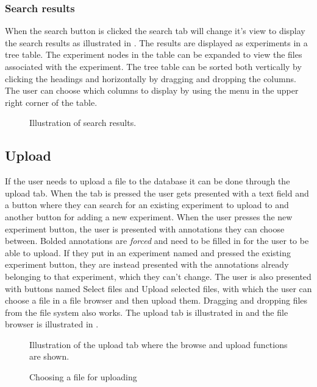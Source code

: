 \subsubsection{Search results}
When the search button is clicked the search tab will change it's view to display the search results as illustrated in . The results are displayed as experiments in a tree table. The experiment nodes in the table can be expanded to view the files associated with the experiment. The tree table can be sorted both vertically by clicking the headings and horizontally by dragging and dropping the columns. The user can choose which columns to display by using the menu in the upper right corner of the table.

\begin{figure}[htb]
	\caption{Illustration of search results.}
	\label{fig:des_search-results}
\end{figure}


\subsection{Upload}
If the user needs to upload a file to the database it can be done through the upload tab.
When the tab is pressed the user gets presented with a text field and a button where they can search for an existing experiment to upload to and another button for adding a new experiment. When the user presses the new experiment button, the user is presented with annotations they can choose between. Bolded annotations are {\em forced} and need to be filled in for the user to be able to upload. If they put in an experiment named and pressed the existing experiment button, they are instead presented with the annotations already belonging to that experiment, which they can't change. The user is also presented with buttons named Select files and Upload selected files, with which the user can choose a file in a file browser and then upload them. Dragging and dropping files from the file system also works. The upload tab is illustrated in  and the file browser is illustrated in .
\begin{figure}[htb]
	\caption{Illustration of the upload tab where the browse and upload functions are shown.}
	\label{fig:des_upload-view}
\end{figure}

\begin{figure}[htb]
	\caption{Choosing a file for uploading}
	\label{fig:des_upload}
\end{figure}
\FloatBarrier

